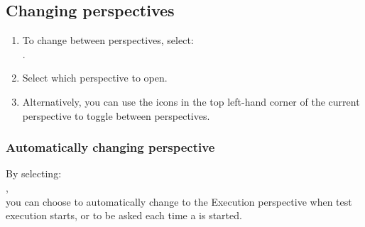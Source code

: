 \subsection{Changing perspectives}
\begin{enumerate}
\item To change between perspectives, select:\\
.
\item Select which perspective to 
open. 

\item Alternatively, you can use the icons in the top left-hand
corner of the current perspective to toggle between perspectives. 
\end{enumerate}

\subsubsection{Automatically changing perspective}
By selecting:\\
 ,\\
you can choose to automatically change to the Execution perspective when  test execution starts, 
or to be asked each time a \gdsuite{} is started. 








